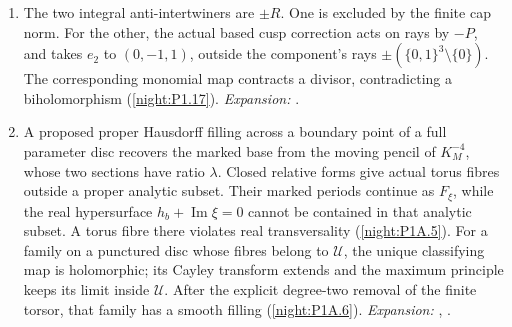 \begin{enumerate}[label=\arabic*.,leftmargin=*]
  distinguished values.  The simultaneous linear centralizer is
  $\mathbb Q I$; the order-five affine norm excludes its negative
  integral unit.  The translation sheaf has identity component
  $\mathbb C$ and an integral parabolic quotient $\mathbb Z/2$,
  represented by the displayed half-period, proving the
  automorphism group and equality of parameters for isomorphic
  members (\cref{night:P1A.4}).
\textit{Expansion:} .
\item\hypertarget{step-V-E-5}{} The two integral anti-intertwiners are $\pm R$.  One is excluded
  by the finite cap norm.  For the other, the actual based cusp
  correction acts on rays by $-P$, and takes $e_2$ to $(0,-1,1)$,
  outside the component's rays $\pm(\{0,1\}^3\setminus\{0\})$.
  The corresponding monomial map contracts a divisor, contradicting
  a biholomorphism (\cref{night:P1.17}).
\textit{Expansion:} .
\item\hypertarget{step-V-E-6}{} A proposed proper Hausdorff filling across a boundary point of
  a full parameter disc recovers the marked base from the moving
  pencil of $K_M^{-4}$, whose two sections have ratio $\lambda$.
  Closed relative forms give actual torus fibres outside a proper
  analytic subset.  Their marked periods continue as $F_\xi$,
  while the real hypersurface $h_b+\operatorname{Im}\xi=0$
  cannot be contained in that analytic subset.  A torus fibre
  there violates real transversality (\cref{night:P1A.5}).  For a family on a punctured disc whose
  fibres belong to $\mathcal U$, the unique classifying map is
  holomorphic; its Cayley transform extends and the maximum principle
  keeps its limit inside $\mathcal U$.  After the explicit degree-two
  removal of the finite torsor, that family has a smooth filling
  (\cref{night:P1A.6}).
\textit{Expansion:} , .
\end{enumerate}

\hypertarget{outline-V-F}{}
